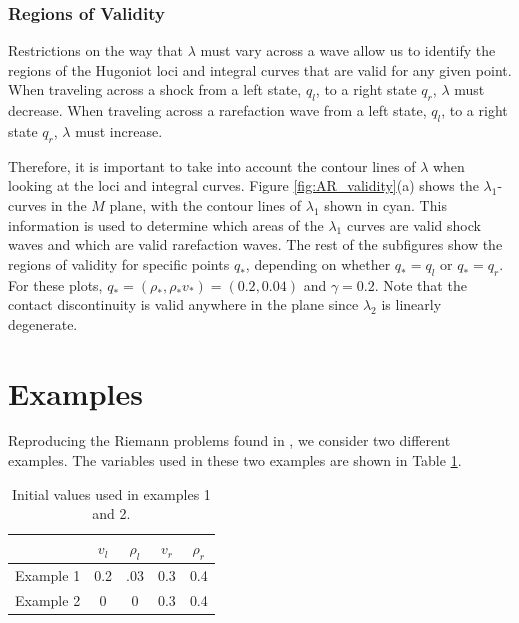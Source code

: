 \documentclass{article}
\begin{document}
\subsubsection{Regions of Validity}
Restrictions on the way that $\lambda$ must vary across a wave allow us to identify the regions of the Hugoniot loci and integral curves that are valid for any given point. When traveling across a shock from a left state, $q_l$, to a right state $q_r$, $\lambda$ must decrease. When traveling across a rarefaction wave from a left state, $q_l$, to a right state $q_r$, $\lambda$ must increase. 

Therefore, it is important to take into account the contour lines of $\lambda$ when 
looking at the loci and integral curves. Figure \ref{fig:AR_validity}(a) 
shows the $\lambda_1$-curves in the $M$ plane,
with the contour lines of $\lambda_1$ shown in cyan. This information is used
to determine which areas of the $\lambda_1$ curves are valid shock waves and which
are valid rarefaction waves. The rest of the subfigures show the regions of validity for 
specific points $q_*$, depending on whether $q_* = q_l$ or $q_* = q_r$. For these plots,
$q_* = (\rho_*,\rho_*v_*) = (0.2, 0.04)$ and $\gamma = 0.2$. Note that the contact discontinuity is valid
anywhere in the plane since $\lambda_2$ is linearly degenerate.

\section{Examples}

Reproducing the Riemann problems found in \cite{AwRascle2000}, we consider two different examples. The variables used in these two examples are shown in Table \ref{table:1}.

\vspace{-2ex}
\begin{table}[H]
\caption{Initial values used in examples 1 and 2.}
\begin{center}
\begin{tabular}{| c | c c  c c|}
\hline
& $v_l$ & $\rho_l $ & $v_r$ & $\rho_r $\\
\hline
Example 1 & 0.2 & .03 & 0.3 & 0.4 \\
Example 2 & 0 & 0 & 0.3 & 0.4\\
\hline
\end{tabular}
\end{center}
 \label{table:1}
\end{table}
\end{document}

